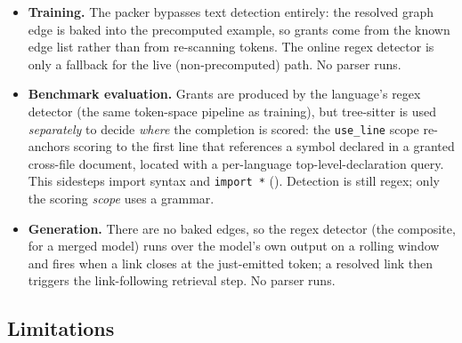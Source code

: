 \begin{itemize}
  \item \textbf{Training.} The packer bypasses text detection entirely: the resolved
        graph edge is baked into the precomputed example, so grants come from the
        known edge list rather than from re-scanning tokens. The online regex detector
        is only a fallback for the live (non-precomputed) path. No parser runs.
  \item \textbf{Benchmark evaluation.} Grants are produced by the language's regex
        detector (the same token-space pipeline as training), but tree-sitter is used
        \emph{separately} to decide \emph{where} the completion is scored: the
        \texttt{use\_line} scope re-anchors scoring to the first line that references
        a symbol declared in a granted cross-file document, located with a per-language
        top-level-declaration query. This sidesteps import syntax and \texttt{import~*}
        (). Detection is still regex; only the scoring \emph{scope}
        uses a grammar.
  \item \textbf{Generation.} There are no baked edges, so the regex detector (the
        composite, for a merged model) runs over the model's own output on a rolling
        window and fires when a link closes at the just-emitted token; a resolved link
        then triggers the link-following retrieval step. No parser runs.
\end{itemize}

\subsection{Limitations}
\label{app:linkdet:fail}

